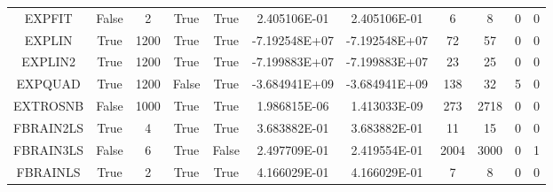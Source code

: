 \begin{longtable}{ccccccccccc}
	\cellcolor{default1} EXPFIT& \cellcolor{default1} False& \cellcolor{default1} 2& \cellcolor{default1} True& \cellcolor{default1} True& \cellcolor{best} 2.405106E-01& \cellcolor{ok} 2.405106E-01& \cellcolor{best} 6& \cellcolor{ok} 8& \cellcolor{default1} 0& \cellcolor{default1} 0\\
	\cellcolor{default2} EXPLIN& \cellcolor{default2} True& \cellcolor{default2} 1200& \cellcolor{default2} True& \cellcolor{default2} True& \cellcolor{best} -7.192548E+07& \cellcolor{ok} -7.192548E+07& \cellcolor{ok} 72& \cellcolor{best} 57& \cellcolor{default2} 0& \cellcolor{default2} 0\\
	\cellcolor{default1} EXPLIN2& \cellcolor{default1} True& \cellcolor{default1} 1200& \cellcolor{default1} True& \cellcolor{default1} True& \cellcolor{best} -7.199883E+07& \cellcolor{ok} -7.199883E+07& \cellcolor{best} 23& \cellcolor{ok} 25& \cellcolor{default1} 0& \cellcolor{default1} 0\\
	\cellcolor{default2} EXPQUAD& \cellcolor{default2} True& \cellcolor{default2} 1200& \cellcolor{default2} False& \cellcolor{default2} True& \cellcolor{ok} -3.684941E+09& \cellcolor{best} -3.684941E+09& \cellcolor{poor} 138& \cellcolor{best} 32& \cellcolor{default2} 5& \cellcolor{default2} 0\\
	\cellcolor{default1} EXTROSNB& \cellcolor{default1} False& \cellcolor{default1} 1000& \cellcolor{default1} True& \cellcolor{default1} True& \cellcolor{ok} 1.986815E-06& \cellcolor{best} 1.413033E-09& \cellcolor{best} 273& \cellcolor{poor} 2718& \cellcolor{default1} 0& \cellcolor{default1} 0\\
	\cellcolor{default2} FBRAIN2LS& \cellcolor{default2} True& \cellcolor{default2} 4& \cellcolor{default2} True& \cellcolor{default2} True& \cellcolor{best} 3.683882E-01& \cellcolor{ok} 3.683882E-01& \cellcolor{best} 11& \cellcolor{ok} 15& \cellcolor{default2} 0& \cellcolor{default2} 0\\
	\cellcolor{default1} FBRAIN3LS& \cellcolor{default1} False& \cellcolor{default1} 6& \cellcolor{default1} True& \cellcolor{default1} False& \cellcolor{poor} 2.497709E-01& \cellcolor{best} 2.419554E-01& \cellcolor{best} 2004& \cellcolor{ok} 3000& \cellcolor{default1} 0& \cellcolor{default1} 1\\
	\cellcolor{default2} FBRAINLS& \cellcolor{default2} True& \cellcolor{default2} 2& \cellcolor{default2} True& \cellcolor{default2} True& \cellcolor{ok} 4.166029E-01& \cellcolor{best} 4.166029E-01& \cellcolor{best} 7& \cellcolor{ok} 8& \cellcolor{default2} 0& \cellcolor{default2} 0\\

\end{longtable}
